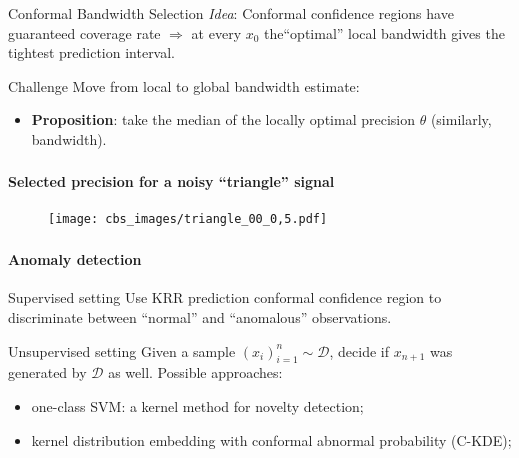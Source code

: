 \documentclass[t]{beamer}  %
\newcommand{\Dcal}{\mathcal{D}}
\begin{document}
\begin{frame}[c]\frametitle{\insertsection}
  \framesubtitle{\insertsubsection}
  \begin{block}{Conformal Bandwidth Selection}
    \textit{Idea}: Conformal confidence regions have guaranteed coverage rate
    $\Rightarrow$ at every $x_0$ the``optimal'' local bandwidth gives the tightest
    prediction interval.
  \end{block}

  \vspace{\baselineskip}
  \begin{block}{Challenge}
    Move from local to global bandwidth estimate: \begin{itemize}
      \item \textbf{Proposition}: take the median of the locally optimal
      precision $\theta$ (similarly, bandwidth).
    \end{itemize}
  \end{block}
\end{frame}

\begin{frame}[t]\frametitle{\insertsection}
  \framesubtitle{Selected precision for a noisy ``triangle'' signal}
  \begin{figure}%
    \centering
    \texttt{[image: cbs\_images/triangle\_00\_0,5.pdf]}
  \end{figure}
\end{frame}


\begin{frame}[t]\frametitle{\insertsection}
  \framesubtitle{Anomaly detection}
  \begin{block}{Supervised setting}
    Use KRR prediction conformal confidence region to discriminate between
    ``normal'' and ``anomalous'' observations.
  \end{block}

  \begin{block}{Unsupervised setting}
    Given a sample $(x_i)_{i=1}^n\sim \Dcal$, decide if $x_{n+1}$ was generated
    by $\Dcal$ as well. Possible approaches:
    \begin{itemize}
      \item one-class SVM: a kernel method for novelty detection;
      \item kernel distribution embedding with conformal abnormal probability (C-KDE);
    \end{itemize}
  \end{block}
\end{frame}
\end{document}
